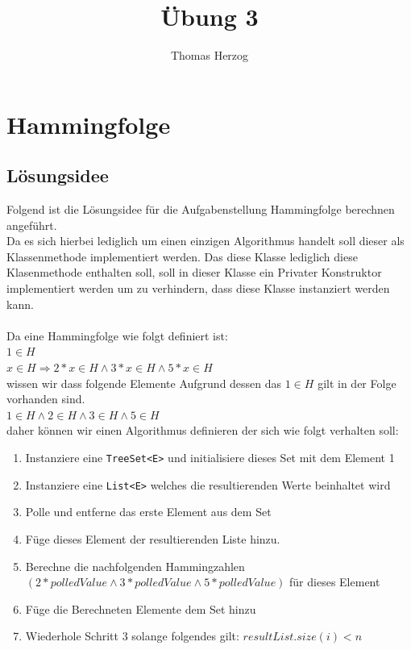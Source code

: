 \documentclass[11pt, a4paper, twoside]{article}   	%
\title{Übung 3}
\author{Thomas Herzog}
\newcommand{\ideaSection}{Lösungsidee}
\newcommand{\inlinecode}{\lstinline[style=inlineSource]}
\begin{document}
\setlength{\headheight}{15mm}
{\color{myred}
	\section
		{Hammingfolge}
}
\subsection{\ideaSection}
Folgend ist die Lösungsidee für die Aufgabenstellung Hammingfolge berechnen angeführt.\\
Da es sich hierbei lediglich um einen einzigen Algorithmus handelt soll dieser als Klassenmethode implementiert werden. Das diese Klasse lediglich diese Klasenmethode enthalten soll, soll in dieser Klasse ein Privater Konstruktor implementiert werden um zu verhindern, dass diese Klasse instanziert werden kann.\\\\
Da eine Hammingfolge wie folgt definiert ist:\\
$1 \in H$ \\
$x \in H \Rightarrow 2 \ast x \in H \wedge 3 \ast x \in H \wedge 5 \ast x \in H$\\
wissen wir dass folgende Elemente Aufgrund dessen das $1 \in H$ gilt in der Folge vorhanden sind. \\
$1 \in H \wedge 2 \in H \wedge 3 \in H \wedge 5 \in H$\\
daher können wir einen Algorithmus definieren der sich wie folgt verhalten soll:
\begin{enumerate}
	\item Instanziere eine \inlinecode{TreeSet<E>} und initialisiere dieses Set mit dem Element 1
	\item Instanziere eine \inlinecode{List<E>} welches die resultierenden Werte beinhaltet wird
	\item Polle und entferne das erste Element aus dem Set
	\item Füge dieses Element der resultierenden Liste hinzu.		
	\item Berechne die nachfolgenden Hammingzahlen $(2 \ast polledValue \wedge 3 \ast polledValue \wedge 5 \ast polledValue)$ für dieses Element
	\item Füge die Berechneten Elemente dem Set hinzu
	\item Wiederhole Schritt 3 solange folgendes gilt: $resultList.size(i) < n$
\end{enumerate}
\end{document}
